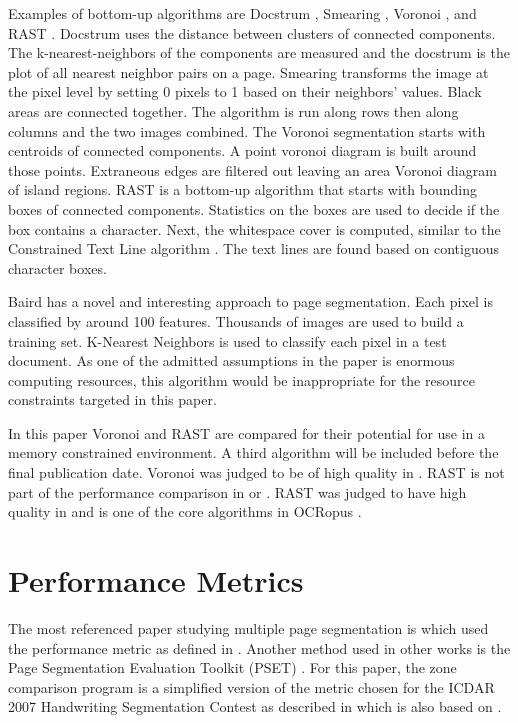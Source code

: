 \documentclass[conference]{IEEEtran}
\begin{document}
Examples of bottom-up algorithms are 
    Docstrum \cite{o1993document},
    Smearing \cite{wong1982document}, 
    Voronoi \cite{kise1998segmentation}, and
    RAST \cite{breuel2001practical}.
Docstrum uses the distance between clusters of connected components. The
k-nearest-neighbors of the components are measured and the docstrum is the plot
of all nearest neighbor pairs on a page.  Smearing transforms the image at the pixel level
by setting 0 pixels to 1 based on their neighbors' values. Black areas are
connected together. The algorithm is run along rows then along columns and the
two images combined.
The Voronoi segmentation starts with centroids of connected components. A point voronoi
diagram is built around those points. Extraneous edges are filtered out leaving
an area Voronoi diagram of island regions.
RAST is a bottom-up algorithm that starts with bounding boxes of connected
components. Statistics on the boxes are used to decide if the box contains a
character. Next, the whitespace cover is computed, similar to the Constrained
Text Line algorithm \cite{breuel2002two}.  
The text lines are found based on contiguous character boxes.

Baird \cite{baird2006versatile} has a novel and interesting approach to page
segmentation. Each pixel is classified by around 100 features. Thousands of
images are used to build a training set. K-Nearest Neighbors is used
to classify each pixel in a test document. As one of the admitted assumptions
in the paper is enormous computing resources, this algorithm would be
inappropriate for the resource constraints targeted in this paper.

In this paper Voronoi and RAST are compared for their potential for use in a
memory constrained environment. A third algorithm will be included before the
final publication date.  
Voronoi was judged to be of high quality in \cite{shafait2006performance}. 
RAST is not part of the performance comparison in \cite{shafait2006performance} or \cite{mao2000empirical}. 
RAST was judged to have high quality in \cite{winder2010extending} and is one of
the core algorithms in OCRopus \cite{breuel2008ocropus}. 


\section{Performance Metrics}
The most referenced paper studying multiple page segmentation is
\cite{shafait2006performance} which used the performance metric as defined in
\cite{phillips1999empirical}. Another method used in other works is the Page
Segmentation Evaluation Toolkit (PSET) \cite{mao2000pset,mao2002software}.  For
this paper, the zone comparison program is a simplified version of the
metric chosen for the ICDAR 2007 Handwriting Segmentation Contest as described
in \cite{antonacopoulos2007page} which is also based on
\cite{phillips1999empirical}.
\end{document}

